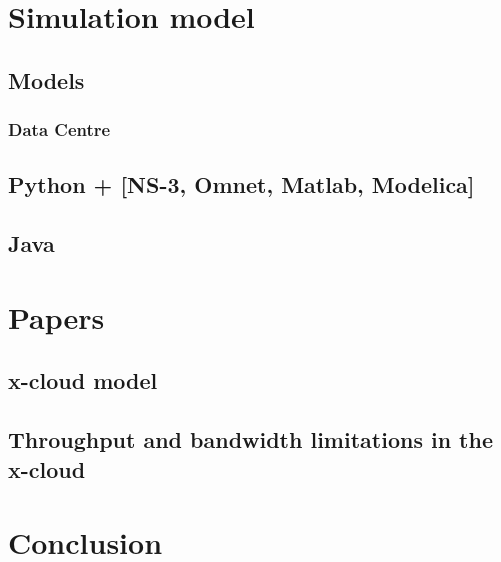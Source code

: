 \documentclass[conference]{IEEEtran}
\newcommand{\xcloud}{x-cloud }
\begin{document}
\section{Simulation model}

\subsection{Models}
\subsubsection{Data Centre}
\cite{5959161}

\subsection{Python + [NS-3, Omnet, Matlab, Modelica]}

\subsection{Java}

\section{Papers}

\subsection{\xcloud model}

\subsection{Throughput and bandwidth limitations in the \xcloud}

\section{Conclusion}




\end{document}

